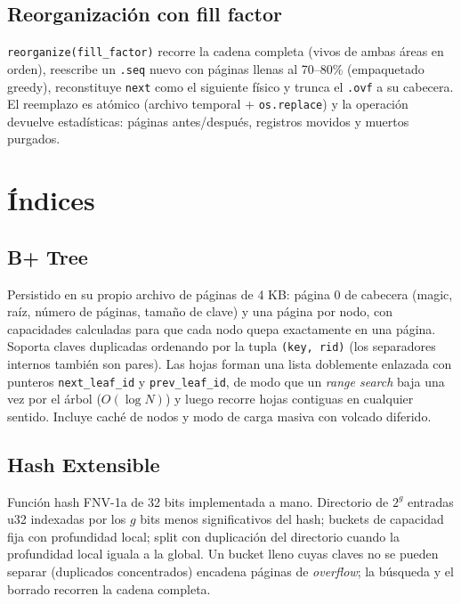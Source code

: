 \documentclass[11pt]{article}
\begin{document}
\subsection{Reorganización con fill factor}

\texttt{reorganize(fill\_factor)} recorre la cadena completa (vivos de
ambas áreas en orden), reescribe un \texttt{.seq} nuevo con páginas llenas
al 70--80\% (empaquetado greedy), reconstituye \texttt{next} como el
siguiente físico y trunca el \texttt{.ovf} a su cabecera. El reemplazo es
atómico (archivo temporal + \texttt{os.replace}) y la operación devuelve
estadísticas: páginas antes/después, registros movidos y muertos purgados.

\section{Índices}

\subsection{B+ Tree}

Persistido en su propio archivo de páginas de 4 KB: página 0 de cabecera
(magic, raíz, número de páginas, tamaño de clave) y una página por nodo,
con capacidades calculadas para que cada nodo quepa exactamente en una
página. Soporta claves duplicadas ordenando por la tupla \texttt{(key, rid)}
(los separadores internos también son pares). Las hojas forman una lista
doblemente enlazada con punteros \texttt{next\_leaf\_id} y
\texttt{prev\_leaf\_id}, de modo que un \emph{range search} baja una vez por
el árbol ($O(\log N)$) y luego recorre hojas contiguas en cualquier
sentido. Incluye caché de
nodos y modo de carga masiva con volcado diferido.

\subsection{Hash Extensible}

Función hash FNV-1a de 32 bits implementada a mano. Directorio de $2^g$
entradas u32 indexadas por los $g$ bits menos significativos del hash;
buckets de capacidad fija con profundidad local; split con duplicación del
directorio cuando la profundidad local iguala a la global. Un bucket lleno
cuyas claves no se pueden separar (duplicados concentrados) encadena
páginas de \emph{overflow}; la búsqueda y el borrado recorren la cadena
completa.
\end{document}

